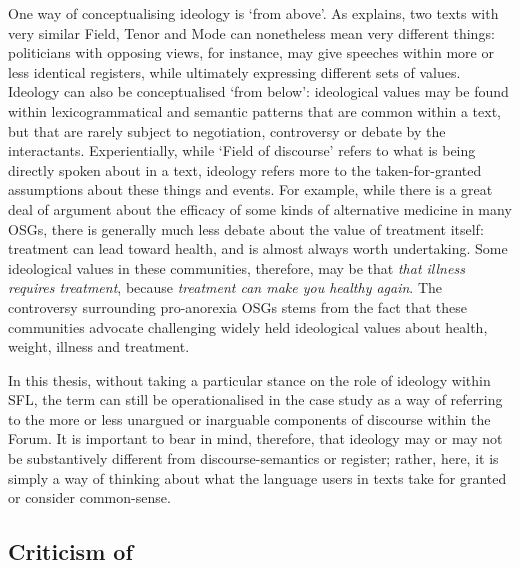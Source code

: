 One way of conceptualising ideology is `from above'. As \textcite{banks2009ideology} explains, two texts with very similar Field, Tenor and Mode can nonetheless mean very different things: politicians with opposing views, for instance, may give speeches within more or less identical registers, while ultimately expressing different sets of values. Ideology can also be conceptualised `from below': ideological values may be found within lexicogrammatical and semantic patterns that are common within a text, but that are rarely subject to negotiation, controversy or debate by the interactants. Experientially, while `Field of discourse' refers to what is being directly spoken about in a text, ideology refers more to the taken\hyp{}for\hyp{}granted assumptions about these things and events. For example, while there is a great deal of argument about the efficacy of some kinds of alternative medicine in many \glspl{OSG}, there is generally much less debate about the value of treatment itself: treatment can lead toward health, and is almost always worth undertaking. Some ideological values in these communities, therefore, may be that \emph{that illness requires treatment}, because \emph{treatment can make you healthy again}. The controversy surrounding pro\hyp{}anorexia \glspl{OSG} \cite[see e.g.][]{chancellor_recovery_2016} stems from the fact that these communities advocate challenging widely held ideological values about health, weight, illness and treatment.

In this thesis, without taking a particular stance on the role of ideology within \gls{SFL}, the term can still be operationalised in the case study as a way of referring to the more or less unargued or inarguable components of discourse within the \gls{Forum}. It is important to bear in mind, therefore, that ideology may or may not be substantively different from \glspl{discourse-semantic} or register; rather, here, it is simply a way of thinking about what the language users in texts take for granted or consider common\hyp{}sense.

\subsection{Criticism of }

